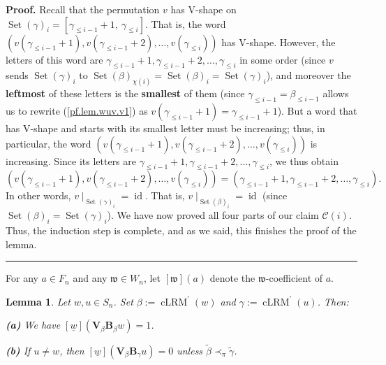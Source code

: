 \documentclass[submission]{FPSAC2026}
\newtheorem{lem}{Lemma}
\newcommand{\id}{\operatorname{id}} %
\newcommand{\tup}[1]{\left( #1 \right)}
\newenvironment{proof}[1][Proof]{\noindent\textbf{#1.} }{\ \rule{0.5em}{0.5em}}
\begin{document}
\begin{proof}
Recall that the permutation $v$ has V-shape on $\operatorname*{Set}\left(
\gamma\right)  _{i} =\left[
\gamma_{\leq i-1}+1,\ \gamma_{\leq i}\right] $. That is, the word
$\tup{v\tup{\gamma_{\leq i-1} + 1}, v\tup{\gamma_{\leq i-1} + 2}, \ldots,
v\tup{\gamma_{\leq i}}}$ has V-shape.
However, the letters of this word are $\gamma_{\leq i-1} + 1,
\gamma_{\leq i-1} + 2, \ldots, \gamma_{\leq i}$ in some order
(since $v$ sends $\operatorname*{Set}\left(
\gamma\right)  _{i}$ to $\operatorname*{Set}\left(  \beta\right)
_{\chi\left(  i\right)  }=\operatorname*{Set}\left(  \beta\right)
_{i}=\operatorname*{Set}\left(  \gamma\right)  _{i}$),
and moreover the \textbf{leftmost} of these letters is the
\textbf{smallest} of them (since $\gamma_{\leq
i-1}=\beta_{\leq i-1}$ allows us to rewrite (\ref{pf.lem.wuv.v1}) as $v\left(
\gamma_{\leq i-1}+1\right)  =\gamma_{\leq i-1}+1$).
But a word that has V-shape and starts with its smallest letter
must be increasing; thus, in particular, the word
$\tup{v\tup{\gamma_{\leq i-1} + 1}, v\tup{\gamma_{\leq i-1} + 2}, \ldots,
v\tup{\gamma_{\leq i}}}$ is increasing.
Since its letters are $\gamma_{\leq i-1} + 1,
\gamma_{\leq i-1} + 2, \ldots, \gamma_{\leq i}$, we thus obtain
\[
\tup{v\tup{\gamma_{\leq i-1} + 1}, v\tup{\gamma_{\leq i-1} + 2}, \ldots,
v\tup{\gamma_{\leq i}}}
= \tup{\gamma_{\leq i-1} + 1,
\gamma_{\leq i-1} + 2, \ldots, \gamma_{\leq i}}.
\]
In other words,
$\left. v\mid_{\operatorname*{Set}\left(  \gamma\right)  _{i}}\right.
= \id $.
That is, $\left. v\mid_{\operatorname*{Set}\left(  \beta\right)  _{i}}%
\right. = \id $ (since $\operatorname*{Set}\left(  \beta\right)
_{i}=\operatorname*{Set}\left(  \gamma\right)  _{i}$).
We have now proved all four parts of our claim $\mathcal{C}\left(  i\right)
$. Thus, the induction step is complete, and as we said, this finishes the
proof of the lemma.
\end{proof}


For any $a \in F_n$ and any $\mathfrak w \in W_{n}$, let
$[\mathfrak w](a)$ denote the $\mathfrak w$-coefficient of $a$.

\begin{lem}
\label{lem.wu2}Let $w,u\in S_{n}$. Set $\beta:=\operatorname{cLRM}^{\prime
}(w)$ and $\gamma:=\operatorname{cLRM}^{\prime}(u)$. Then:

\textbf{(a)} We have $\left[ \underline w\right]
\left(  \mathbf{V}_{\beta} \mathbf{B}_{\beta}w\right)  =1$.

\textbf{(b)} If $u\neq w$, then $\left[  \underline w\right]
\left(  \mathbf{V}_{\beta
}\mathbf{B}_{\gamma}u\right)  =0$ unless $\widetilde{\beta}\prec_{\pi
}\widetilde{\gamma}$.
\end{lem}
\end{document}
